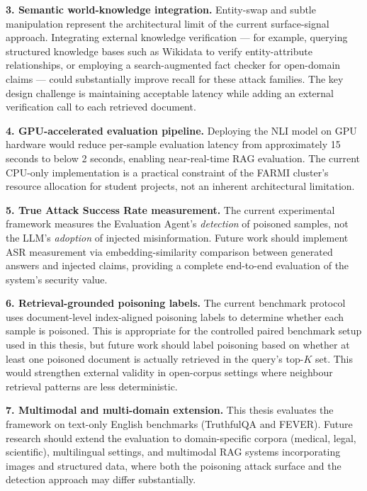 \textbf{3. Semantic world-knowledge integration.}
Entity-swap and subtle manipulation represent the architectural limit of the current surface-signal approach. Integrating external knowledge verification --- for example, querying structured knowledge bases such as Wikidata to verify entity-attribute relationships, or employing a search-augmented fact checker for open-domain claims --- could substantially improve recall for these attack families. The key design challenge is maintaining acceptable latency while adding an external verification call to each retrieved document.

\textbf{4. GPU-accelerated evaluation pipeline.}
Deploying the NLI model on GPU hardware would reduce per-sample evaluation latency from approximately 15 seconds to below 2 seconds, enabling near-real-time RAG evaluation. The current CPU-only implementation is a practical constraint of the FARMI cluster's resource allocation for student projects, not an inherent architectural limitation.

\textbf{5. True Attack Success Rate measurement.}
The current experimental framework measures the Evaluation Agent's \textit{detection} of poisoned samples, not the LLM's \textit{adoption} of injected misinformation. Future work should implement ASR measurement via embedding-similarity comparison between generated answers and injected claims, providing a complete end-to-end evaluation of the system's security value.

\textbf{6. Retrieval-grounded poisoning labels.}
The current benchmark protocol uses document-level index-aligned poisoning labels to determine whether each sample is poisoned. This is appropriate for the controlled paired benchmark setup used in this thesis, but future work should label poisoning based on whether at least one poisoned document is actually retrieved in the query's top-$K$ set. This would strengthen external validity in open-corpus settings where neighbour retrieval patterns are less deterministic.

\textbf{7. Multimodal and multi-domain extension.}
This thesis evaluates the framework on text-only English benchmarks (TruthfulQA and FEVER). Future research should extend the evaluation to domain-specific corpora (medical, legal, scientific), multilingual settings, and multimodal RAG systems incorporating images and structured data, where both the poisoning attack surface and the detection approach may differ substantially.

